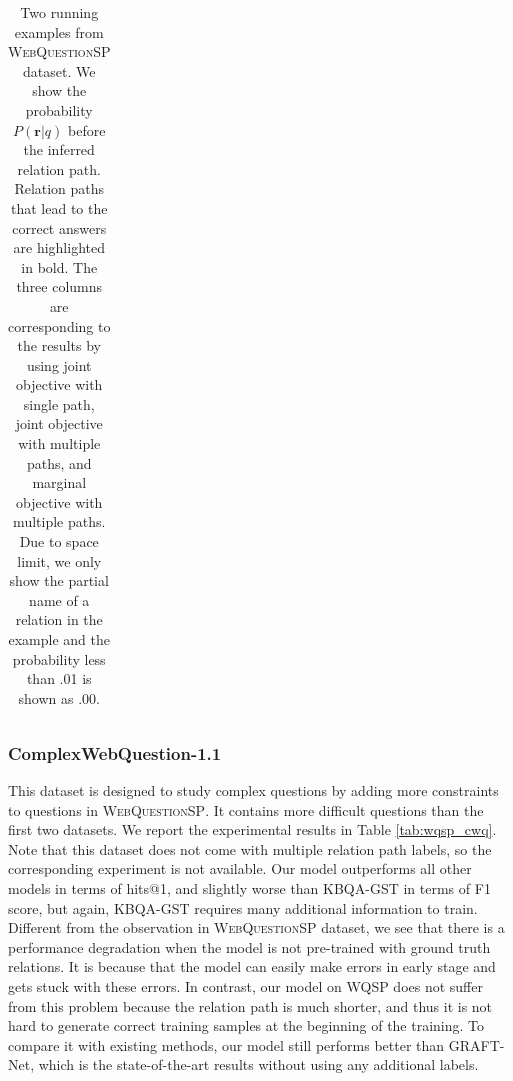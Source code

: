 \begin{table}[t]
{\begin{tabular}{l|l|l}
\end{tabular}
}\caption{\fontsize{10}{12}\selectfont Two running examples from \textsc{WebQuestionSP} dataset. We show the probability $P(\mathbf{r}|q)$ before the inferred relation path. Relation paths that lead to the correct answers are highlighted in bold. The three columns are corresponding to the results by using joint objective with single path, joint objective with multiple paths, and marginal objective with multiple paths. Due to space limit, we only show the partial name of a relation in the example and the probability less than .01 is shown as .00.}\label{tab:case}
\end{table}

\subsubsection{ComplexWebQuestion-1.1}

This dataset is designed to study complex questions by adding more constraints to questions in \textsc{WebQuestionSP}. It contains more difficult questions than the first two datasets.  We report the experimental results in Table \ref{tab:wqsp_cwq}. Note that this dataset does not come with multiple relation path labels, so the corresponding experiment is not available. Our model outperforms all other models in terms of hits@1, and slightly worse than KBQA-GST in terms of F1 score, but again, KBQA-GST requires many additional information to train. Different from the observation in \textsc{WebQuestionSP} dataset, we see that there is a performance degradation when the model is not pre-trained with ground truth relations. It is because that the model can easily make errors in early stage and gets stuck with these errors. In contrast, our model on WQSP does not suffer from this problem because the relation path is much shorter, and thus it is not hard to generate correct training samples at the beginning of the training. To compare it with existing methods, our model still performs better than GRAFT-Net, which is the state-of-the-art results without using any additional labels.


